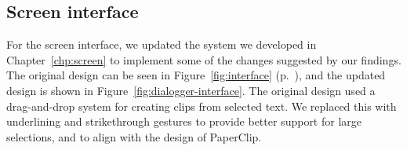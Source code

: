 


\subsection{Screen interface}\label{sec:paper-screen-design}

For the screen interface, we updated the system we developed in Chapter~\ref{chp:screen} to implement some of the
changes suggested by our findings.  The original design can be seen in Figure~\ref{fig:interface}
(p.~\pageref{fig:interface}), and the updated design is shown in Figure~\ref{fig:dialogger-interface}.  The original
design used a drag-and-drop system for creating clips from selected text. We replaced this with underlining and
strikethrough gestures to provide better support for large selections, and to align with the design of PaperClip.

